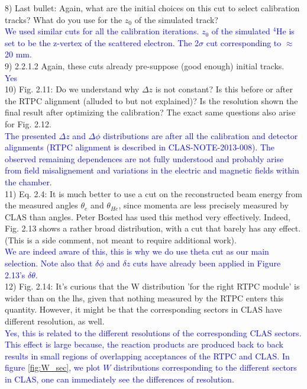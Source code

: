 8) Last bullet: Again, what are the initial choices on this cut to select 
calibration tracks? What do you use for the $z_0$ of the simulated track?  \\
\textcolor{blue}{
   We used similar cuts for all the calibration iterations. $z_0$ of the 
simulated $^{4}$He is set to be the z-vertex of the scattered electron. The 
2$\sigma$ cut corresponding to $\approx$ 20 mm.  }\\

9) 2.2.1.2 Again, these cuts already pre-suppose (good enough) initial tracks.  \\
\textcolor{blue}{Yes}\\

 10) Fig. 2.11: Do we understand why $\Delta z$ is not constant? Is this before 
or after the RTPC alignment (alluded to but not explained)? Is the resolution 
shown the final result after optimizing the calibration? The exact same 
questions also arise for Fig. 2.12. \\
\textcolor{blue}{
  The presented $\Delta z$ and $\Delta\phi$ distributions are after all the 
calibration and detector alignments (RTPC alignment is described in CLAS-NOTE-2013-008).
The observed remaining dependences are not fully understood and probably arise
from field misalignement and variations in the electric and magnetic fields
within the chamber.} \\


11) Eq. 2.4: It is much better to use a cut on the reconstructed beam energy 
from the measured angles $\theta_e$ and $\theta_{He}$, since momenta are less 
precisely measured by CLAS than angles. Peter Bosted has used this method very 
effectively. Indeed, Fig. 2.13 shows a rather broad distribution, with a cut 
that barely has any effect. (This is a side comment, not meant to require 
additional work).\\
\textcolor{blue}{We are indeed aware of this, this is why we do use theta cut
as our main selection. Note also that $\delta\phi$ and $\delta z$ cuts have already
been applied in Figure 2.13's $\delta\theta$.}\\

12) Fig. 2.14: It's curious that the W distribution 'for the right RTPC module' 
is wider than on the lhs, given that nothing measured by the RTPC enters this 
quantity. However, it might be that the corresponding sectors in CLAS have 
different resolution, as well.\\
\textcolor{blue}{
Yes, this is related to the different resolutions of the corresponding CLAS sectors. 
This effect is large because, the reaction products are produced back to back 
results in small regions of overlapping acceptances of the RTPC and CLAS.  
In figure \ref{fig:W_sec}, we plot $W$ distributions corresponding to the 
different sectors in CLAS, one can immediately see the differences of resolution. }\\


